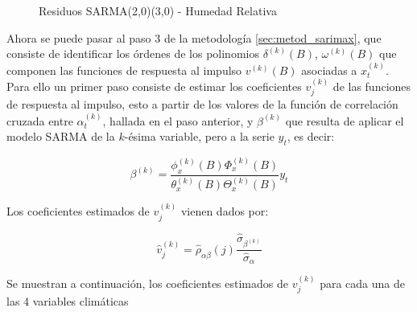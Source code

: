 \documentclass[12pt,oneside]{book}\usepackage[]{graphicx}\usepackage[]{color}
\newenvironment{knitrout}{}{} %
\theoremstyle{definition} %
\begin{document}
\begin{enumerate}
\begin{knitrout}
\begin{figure}[H]
{}

\caption{\label{fig:sarma_humed} Residuos SARMA(2,0)(3,0) - Humedad Relativa}\label{fig:unnamed-chunk-39}
\end{figure}


\end{knitrout}


\end{enumerate}













Ahora se puede pasar al paso 3 de la metodología \ref{sec:metod_sarimax}, que consiste de identificar los órdenes de los polinomios $\delta^{(k)}(B)$, $\omega^{(k)}(B)$ que componen las funciones de respuesta al impulso $v^{(k)}(B)$ asociadas a $x_t^{(k)}$. Para ello un primer paso consiste de estimar los coeficientes $v_j^{(k)}$ de las funciones de respuesta al impulso, esto a partir de los valores de la función de correlación cruzada entre $\alpha_t^{(k)}$, hallada  en el paso anterior, y $\beta^{(k)}$ que resulta de aplicar el modelo SARMA de la $k$-ésima variable, pero a la serie $y_t$, es decir:

$$\beta^{(k)} = \frac{ \phi_x^{(k)}(B) \Phi_x^{(k)}(B) }{\theta_x^{(k)}(B) \Theta_x^{(k)}(B)} y_t$$


Los coeficientes estimados de $v_j^{(k)}$ vienen dados por:

$$\hat v_j^{(k)} = \hat\rho_{\alpha\beta}(j) \frac{\hat\sigma_{\beta^{(k)}}}{\hat\sigma_\alpha} $$

Se muestran a continuación, los coeficientes estimados de $v_j^{(k)}$ para cada una de las 4 variables climáticas
\end{document}

